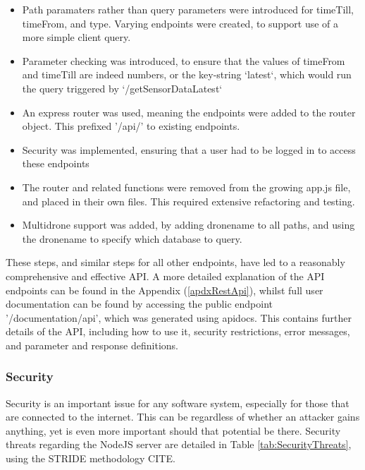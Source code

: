 \documentclass{article}
\begin{document}
\begin{itemize}
	\item Path paramaters rather than query parameters were introduced for timeTill, timeFrom, and type. Varying endpoints were created, to support use of a more simple client query. 
	\item Parameter checking was introduced, to ensure that the values of timeFrom and timeTill are indeed numbers, or the key-string `latest`, which would run the query triggered by `/getSensorDataLatest`
	\item An express router was used, meaning the endpoints were added to the router object. This prefixed '/api/' to existing endpoints. 
	\item Security was implemented, ensuring that a user had to be logged in to access these endpoints
	\item The router and related functions were removed from the growing app.js file, and placed in their own files. This required extensive refactoring and testing.
	\item Multidrone support was added, by adding dronename to all paths, and using the dronename to specify which database to query.
\end{itemize}

These steps, and similar steps for all other endpoints, have led to a reasonably comprehensive and effective API. A more detailed explanation of the API endpoints can be found in the Appendix (\ref{apdxRestApi}), whilst full user documentation can be found by accessing the public endpoint '/documentation/api', which was generated using apidocs\cite{apidocs}. This contains further details of the API, including how to use it, security restrictions, error messages, and parameter and response definitions.

\subsubsection{Security}
Security is an important issue for any software system, especially for those that are connected to the internet. This can be regardless of whether an attacker gains anything, yet is even more important should that potential be there. Security threats regarding the NodeJS server are detailed in Table \ref{tab:SecurityThreats}, using the STRIDE methodology CITE.
\end{document}
